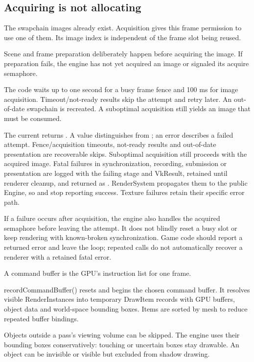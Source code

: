 \documentclass[11pt,a4paper]{article}
\begin{document}
\subsection*{Acquiring is not allocating}
The swapchain images already exist. Acquisition gives this frame permission to use one of them. Its image index is independent of the frame slot being reused.

Scene and frame preparation deliberately happen before acquiring the image. If preparation fails, the engine has not yet acquired an image or signaled its acquire semaphore.

The code waits up to one second for a busy frame fence and 100 ms for image acquisition. Timeout/not-ready results skip the attempt and retry later. An out-of-date swapchain is recreated. A suboptimal acquisition still yields an image that must be consumed.

The current  returns . A value distinguishes  from ; an error describes a failed attempt. Fence/acquisition timeouts, not-ready results and out-of-date presentation are recoverable skips. Suboptimal acquisition still proceeds with the acquired image. Fatal failures in synchronization, recording, submission or presentation are logged with the failing stage and VkResult, retained until renderer cleanup, and returned as . RenderSystem propagates them to the public Engine, so  and  stop reporting success. Texture failures retain their specific error path.

If a failure occurs after acquisition, the engine also handles the acquired semaphore before leaving the attempt. It does not blindly reset a busy slot or keep rendering with known-broken synchronization. Game code should report a returned error and leave the loop; repeated calls do not automatically recover a renderer with a retained fatal error.

\label{core-39}
A command buffer is the GPU's instruction list for one frame.

recordCommandBuffer() resets and begins the chosen command buffer. It resolves visible RenderInstances into temporary DrawItem records with GPU buffers, object data and world-space bounding boxes. Items are sorted by mesh to reduce repeated buffer bindings.

Objects outside a pass's viewing volume can be skipped. The engine uses their bounding boxes conservatively: touching or uncertain boxes stay drawable. An object can be invisible or visible but excluded from shadow drawing.
\end{document}

